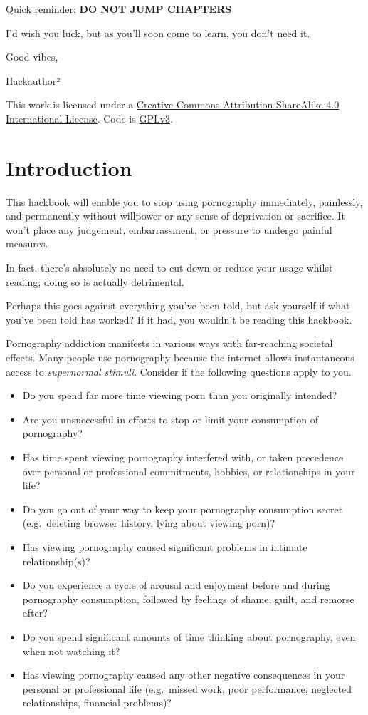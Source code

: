 \documentclass[
]{book}
\begin{document}
Quick reminder: {\textbf{DO NOT JUMP CHAPTERS}}

I'd wish you luck, but as you'll soon come to learn, you don't need it.

Good vibes,

Hackauthor²

This work is licensed under a \href{https://creativecommons.org/licenses/by-sa/4.0/}{Creative Commons Attribution-ShareAlike 4.0 International License}. Code is \href{https://gitlab.com/snuggy/easypeasy/-/blob/master/LICENSE}{GPLv3}.

\hypertarget{introduction}{%
\chapter{Introduction}\label{introduction}}

This hackbook will enable you to stop using pornography immediately, painlessly, and permanently without willpower or any sense of deprivation or sacrifice. It won't place any judgement, embarrassment, or pressure to undergo painful measures.

In fact, there's absolutely no need to cut down or reduce your usage whilst reading; doing so is actually detrimental.

Perhaps this goes against everything you've been told, but ask yourself if what you've been told has worked? If it had, you wouldn't be reading this hackbook.

Pornography addiction manifests in various ways with far-reaching societal effects. Many people use pornography because the internet allows instantaneous access to \emph{supernormal stimuli}. Consider if the following questions apply to you.

\begin{itemize}
\item
  Do you spend far more time viewing porn than you originally intended?
\item
  Are you unsuccessful in efforts to stop or limit your consumption of pornography?
\item
  Has time spent viewing pornography interfered with, or taken precedence over personal or professional commitments, hobbies, or relationships in your life?
\item
  Do you go out of your way to keep your pornography consumption secret (e.g.~deleting browser history, lying about viewing porn)?
\item
  Has viewing pornography caused significant problems in intimate relationship(s)?
\item
  Do you experience a cycle of arousal and enjoyment before and during pornography consumption, followed by feelings of shame, guilt, and remorse after?
\item
  Do you spend significant amounts of time thinking about pornography, even when not watching it?
\item
  Has viewing pornography caused any other negative consequences in your personal or professional life (e.g.~missed work, poor performance, neglected relationships, financial problems)?
\end{itemize}
\end{document}
